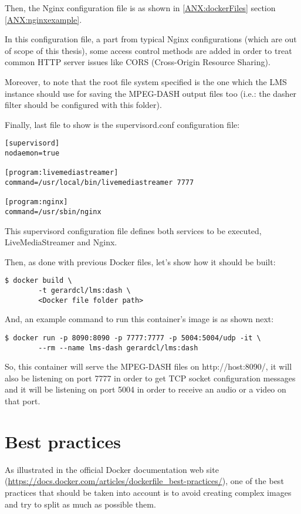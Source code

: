 Then, the Nginx configuration file is as shown in \ref{ANX:dockerFiles} section \ref{ANX:nginxexample}.

In this configuration file, a part from typical Nginx configurations (which are out of scope of this thesis), some access control methods are added in order to treat common HTTP server issues like CORS (Cross-Origin Resource Sharing).

Moreover, to note that the root file system specified is the one which the LMS instance should use for saving the MPEG-DASH output files too (i.e.: the dasher filter should be configured with this folder).

Finally, last file to show is the supervisord.conf configuration file:

\begin{verbatim}
[supervisord]
nodaemon=true

[program:livemediastreamer]
command=/usr/local/bin/livemediastreamer 7777

[program:nginx]
command=/usr/sbin/nginx 
\end{verbatim}

This supervisord configuration file defines both services to be executed, LiveMediaStreamer and Nginx.  

Then, as done with previous Docker files, let's show how it should be built:

\begin{verbatim}
$ docker build \
		-t gerardcl/lms:dash \
		<Docker file folder path>
\end{verbatim}

And, an example command to run this container's image is as shown next:

\begin{verbatim}
$ docker run -p 8090:8090 -p 7777:7777 -p 5004:5004/udp -it \
		--rm --name lms-dash gerardcl/lms:dash 
\end{verbatim}

So, this container will serve the MPEG-DASH files on http://host:8090/, it will also be listening on port 7777 in order to get TCP socket configuration messages and it will be listening on port 5004 in order to receive an audio or a video on that port.

\section{Best practices}

As illustrated in the official Docker documentation web site (\url{https://docs.docker.com/articles/dockerfile_best-practices/}), one of the best practices that should be taken into account is to avoid creating complex images and try to split as much as possible them.

